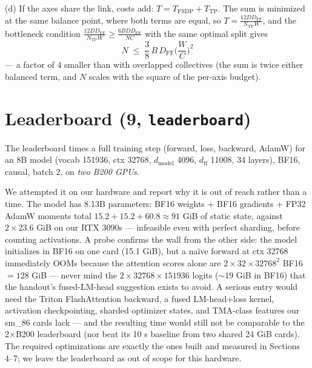 \documentclass[11pt]{article}
\begin{document}
(d) If the axes share the link, costs add: $T = T_{\mathrm{FSDP}} + T_{\mathrm{TP}}$. The sum is
minimized at the same balance point, where both terms are equal, so
$T = \frac{12DD_{\mathrm{FF}}}{N_{\mathrm{TP}}W}$, and the bottleneck condition
$\frac{12DD_{\mathrm{FF}}}{N_{\mathrm{TP}}W} \ge \frac{6BDD_{\mathrm{FF}}}{NC}$ with the same
optimal split gives
\[
N \;\le\; \frac{3}{8}\,B\,D_{\mathrm{FF}}\Big(\frac{W}{C}\Big)^{2}
\]
--- a factor of $4$ smaller than with overlapped collectives (the sum is twice either balanced
term, and $N$ scales with the square of the per-axis budget).

\section{Leaderboard (9, \texttt{leaderboard})}

The leaderboard times a full training step (forward, loss, backward, AdamW) for an 8B model
(vocab 151936, ctx 32768, $d_{\mathrm{model}}$ 4096, $d_{\mathrm{ff}}$ 11008, 34 layers), BF16,
causal, batch 2, on \emph{two B200 GPUs}.

We attempted it on our hardware and report why it is out of reach rather than a time. The model has
8.13B parameters: BF16 weights + BF16 gradients + FP32 AdamW moments total $15.2 + 15.2 + 60.8
\approx 91$ GiB of static state, against $2 \times 23.6$ GiB on our RTX 3090s --- infeasible even
with perfect sharding, before counting activations. A probe confirms the wall from the other side:
the model initializes in BF16 on one card (15.1 GiB), but a na\"ive forward at ctx 32768
immediately OOMs because the attention scores alone are $2 \times 32 \times 32768^2$ BF16 $= 128$
GiB --- never mind the $2 \times 32768 \times 151936$ logits (${\sim}19$ GiB in BF16) that the
handout's fused-LM-head suggestion exists to avoid. A serious entry would need the Triton
FlashAttention backward, a fused LM-head+loss kernel, activation checkpointing, sharded optimizer
states, and TMA-class features our sm\_86 cards lack --- and the resulting time would still not be
comparable to the 2$\times$B200 leaderboard (nor beat its 10 s baseline from two shared 24 GiB
cards). The required optimizations are exactly the ones built and measured in Sections 4--7; we
leave the leaderboard as out of scope for this hardware.
\end{document}
